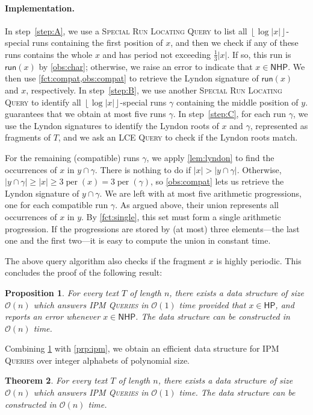 \documentclass[a4paper]{article}
\newtheorem{theorem}{Theorem}[section]
\newtheorem{proposition}[theorem]{Proposition}
\theoremstyle{definition}
\theoremstyle{remark}
\newcommand{\IPM}{\textsc{IPM Queries}\xspace}
\newcommand{\N}{\mathsf{NHP}}
\newcommand{\HP}{\mathsf{HP}}
\newcommand{\floor}[1]{\left\lfloor #1 \right\rfloor}
\DeclareMathOperator{\per}{per}
\newcommand{\Oh}{\mathcal{O}}
\newcommand{\run}{\mathsf{run}}
\begin{document}
\paragraph*{Implementation.}
In step~\ref{step:A}, we use a \textsc{Special Run Locating Query} to list all $\floor{\log |x|}$-special runs containing the first position of $x$, and then we check if any of these runs contains the whole $x$ and has period not exceeding $\frac13|x|$. If so, this run is $\run(x)$ by \cref{obs:char}; otherwise, we raise an error to indicate that $x\in \N$.
We then use \cref{fct:compat,obs:compat} to retrieve the Lyndon signature of $\run(x)$ and $x$, respectively.
In step~\ref{step:B}, we use another \textsc{Special Run Locating Query} to identify all  $\floor{\log |x|}$-special runs $\gamma$ containing the middle position of $y$.  guarantees that we obtain at most five runs $\gamma$.
In step~\ref{step:C}, for each run $\gamma$, we use the Lyndon signatures 
to identify the Lyndon roots of $x$ and $\gamma$, represented as fragments of $T$,
and we ask an \textsc{LCE Query} to check if the Lyndon roots match.

 For the remaining (compatible) runs $\gamma$, we apply \cref{lem:lyndon} to find the occurrences of $x$ in $y\cap \gamma$.
 There is nothing to do if $|x|>|y\cap \gamma|$. 
Otherwise, $|y\cap\gamma|\ge |x|\ge 3\per(x)= 3\per(\gamma)$, so \cref{obs:compat} lets us retrieve the Lyndon signature of $y\cap \gamma$.
 We are left with at most five arithmetic progressions, one for each compatible run $\gamma$.
 As argued above, their union represents all occurrences of $x$ in $y$.
 By \cref{fct:single}, this set must form a single arithmetic progression.
 If the progressions are stored by (at most) three elements---the last one and the first two---it is easy to compute the union in constant time.

The above query algorithm also checks if the fragment $x$ is highly periodic. 
This concludes the proof of the following result:

\begin{proposition}\label{thm:per}
For every text $T$ of length $n$, there exists a data structure of size $\Oh(n)$ which answers \IPM in $\Oh(1)$ time provided that $x\in \HP$,
and reports an error whenever $x\in \N$.
The data structure can be constructed in $\Oh(n)$ time.
\end{proposition}

Combining \cref{thm:per} with \cref{prp:ipm}, we obtain an efficient data structure for \IPM over integer alphabets of polynomial size.
\begin{theorem}\label{thm:ipm0}
  For every text $T$ of length $n$, there exists a data structure of size $\Oh(n)$ which answers \IPM in $\Oh(1)$ time.
  The data structure can be constructed in $\Oh(n)$ time.
\end{theorem}
\end{document}

